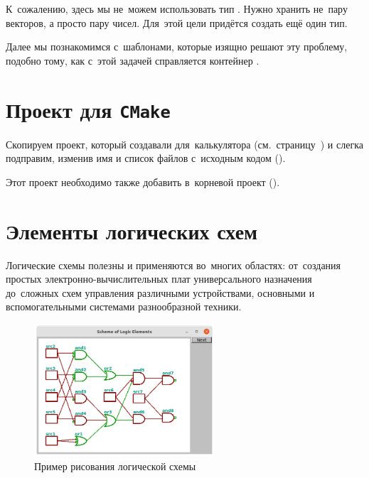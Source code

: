 
К~сожалению, здесь мы не~можем использовать тип . Нужно хранить не~пару векторов, а просто пару чисел. Для~этой цели придётся создать ещё один тип.


Далее мы познакомимся с~шаблонами, которые изящно решают эту проблему, подобно тому, как с~этой задачей справляется контейнер .



\section{Проект для \texttt{CMake}}
Скопируем проект, который создавали для~калькулятора (см.~страницу~\pageref{sect:calcproj}) и слегка подправим, изменив имя и список файлов с~исходным кодом ().


\noindent Этот проект необходимо также добавить в~корневой проект ().




\section{Элементы логических схем}
Логические схемы полезны и применяются во~многих областях: от~создания простых электронно-вычислительных плат универсального назначения до~сложных схем управления различными устройствами, основными и вспомогательными системами разнообразной техники.

\begin{figure}[h]
    {\centering
        \includegraphics[width=0.6\textwidth]{images/logic_elements.png}

    }
    \caption{Пример рисования логической схемы}
    \label{fig:logicelems}
\end{figure}



